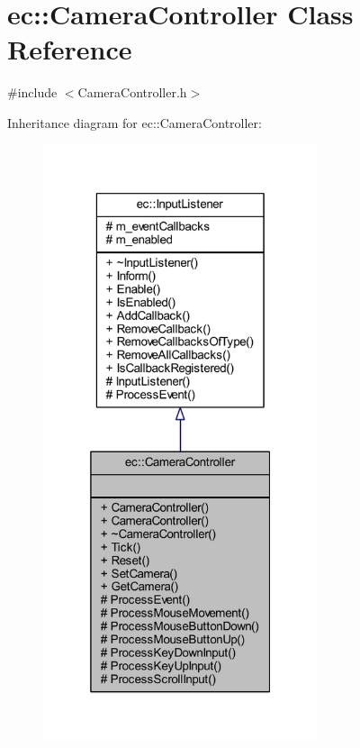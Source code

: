 \hypertarget{classec_1_1_camera_controller}{}\section{ec\+:\+:Camera\+Controller Class Reference}
\label{classec_1_1_camera_controller}


{\ttfamily \#include $<$Camera\+Controller.\+h$>$}



Inheritance diagram for ec\+:\+:Camera\+Controller\+:\nopagebreak
\begin{figure}[H]
\begin{center}
\leavevmode
\includegraphics[width=229pt]{classec_1_1_camera_controller__inherit__graph}
\end{center}
\end{figure}


